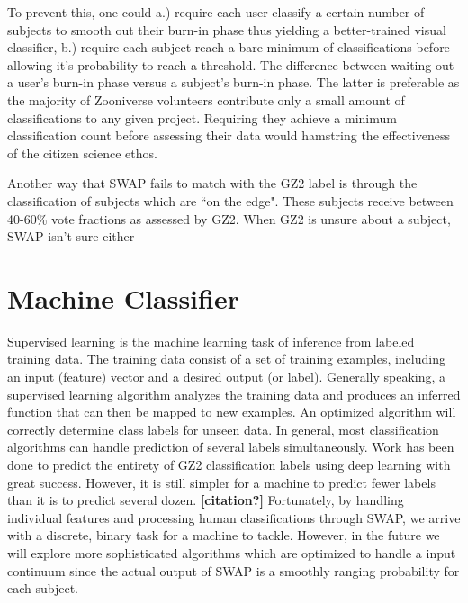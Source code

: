 \documentclass[twocolumn]{aastex6}
\begin{document}
To prevent this, one could a.) require each user classify a certain number of subjects
to smooth out their burn-in phase thus yielding a better-trained visual classifier, 
b.) require each subject reach a bare minimum of classifications before allowing 
it's probability to reach a threshold. The difference between waiting out a user's burn-in 
phase versus a subject's burn-in phase.
The latter is preferable as the majority of Zooniverse volunteers contribute only 
a small amount of classifications to any given project. Requiring they achieve a 
minimum classification count before assessing their data would hamstring
the effectiveness of the citizen science ethos. 

Another way that SWAP fails to match with the GZ2 label is through the classification
of subjects which are ``on the edge". These subjects receive between 40-60\% vote 
fractions as assessed by GZ2. When GZ2 is unsure about a subject, SWAP isn't sure either




\section{Machine Classifier} \label{sec:machine}

Supervised learning is the machine learning task of inference from labeled 
training data. The training data consist of a set of training examples, including
an input (feature) vector and a desired output (or label).  Generally speaking,
a supervised learning algorithm analyzes the training data and produces an inferred 
function that can then be mapped to new examples. An optimized algorithm will 
correctly determine class labels for unseen data. In general, most classification 
algorithms can handle prediction of several labels simultaneously. Work has been
done to predict the entirety of GZ2 classification labels using deep learning 
\citep{Dieleman2015} with great success. However, it is still simpler for a machine
to predict fewer labels than it is to predict several dozen. \textbf{[citation?]} 
Fortunately, by handling individual features and processing human classifications
through SWAP, we arrive with a discrete, binary task for a machine to tackle.
However, in the future we will explore more sophisticated algorithms which 
are optimized to handle a input continuum since the actual output of SWAP
is a smoothly ranging probability for each subject. 
\end{document}
